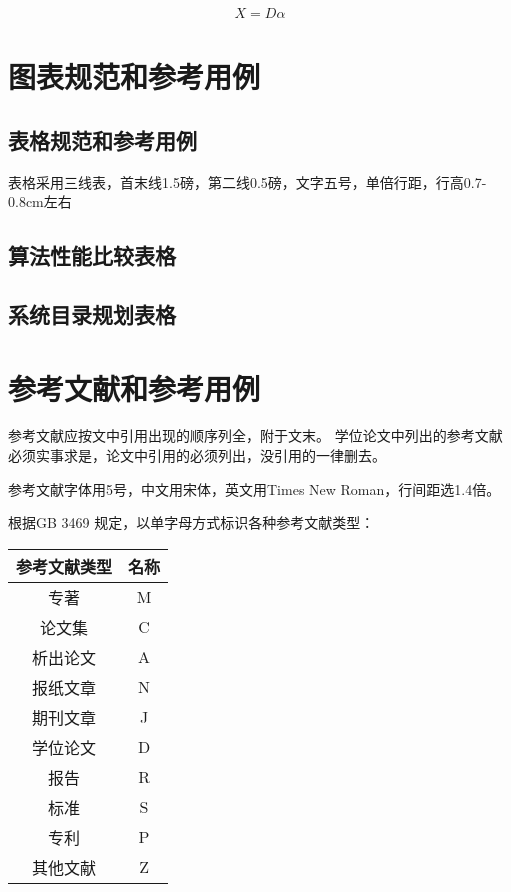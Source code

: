 \documentclass[12pt]{zjutbook}
\begin{document}
\begin{equation}
  X=D\alpha
  \label{eq:sparse}
\end{equation}

\chapter{图表规范和参考用例}
\section{表格规范和参考用例}
表格采用三线表，首末线1.5磅，第二线0.5磅，文字五号，单倍行距，行高0.7-0.8cm左右

\section{算法性能比较表格}
\section{系统目录规划表格}

\chapter{参考文献和参考用例}

参考文献应按文中引用出现的顺序列全，附于文末。
学位论文中列出的参考文献必须实事求是，论文中引用的必须列出，没引用的一律删去。

参考文献字体用5号，中文用宋体，英文用Times New Roman，行间距选1.4倍。

根据GB 3469 规定，以单字母方式标识各种参考文献类型：

\begin{table}[htp]
  \centering
  \begin{tabular}{cc}
    \toprule
    \textbf{参考文献类型} & \textbf{名称} \\
    \midrule
    专著              & M           \\
    论文集             & C           \\
    析出论文            & A           \\
    报纸文章            & N           \\
    期刊文章            & J           \\
    学位论文            & D           \\
    报告              & R           \\
    标准              & S           \\
    专利              & P           \\
    其他文献            & Z           \\
    \bottomrule
  \end{tabular}
\end{table}
\end{document}
